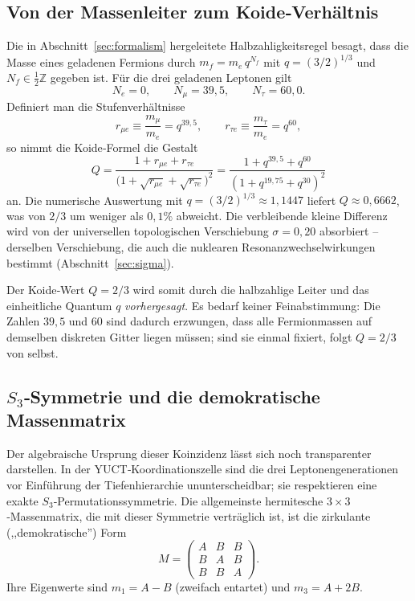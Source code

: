 \documentclass[11pt,a4paper]{article}
\begin{document}
\subsection{Von der Massenleiter zum Koide‑Verhältnis}

Die in Abschnitt~\ref{sec:formalism} hergeleitete Halbzahligkeitsregel
besagt, dass die Masse eines geladenen Fermions durch $m_f = m_e \, q^{N_f}$
mit $q = (3/2)^{1/3}$ und $N_f \in \frac12\mathbb{Z}$ gegeben ist.  Für die
drei geladenen Leptonen gilt
\[
N_e = 0,\qquad N_\mu = 39{,}5,\qquad N_\tau = 60{,}0 .
\]
Definiert man die Stufenverhältnisse
\[
r_{\mu e} \equiv \frac{m_\mu}{m_e} = q^{39{,}5},\qquad
r_{\tau e} \equiv \frac{m_\tau}{m_e} = q^{60},
\]
so nimmt die Koide‑Formel die Gestalt
\begin{equation}
	Q = \frac{1 + r_{\mu e} + r_{\tau e}}{\bigl(1 + \sqrt{r_{\mu e}} + \sqrt{r_{\tau e}}\bigr)^2}
	= \frac{1 + q^{39{,}5} + q^{60}}{(1 + q^{19{,}75} + q^{30})^2}
	\label{eq:Q_ladder}
\end{equation}
an.  Die numerische Auswertung mit $q = (3/2)^{1/3} \approx 1{,}1447$
liefert $Q \approx 0{,}6662$, was von $2/3$ um weniger als $0{,}1\%$
abweicht.  Die verbleibende kleine Differenz wird von der universellen
topologischen Verschiebung $\sigma = 0{,}20$ absorbiert – derselben
Verschiebung, die auch die nuklearen Resonanzwechselwirkungen bestimmt
(Abschnitt~\ref{sec:sigma}).

Der Koide‑Wert $Q = 2/3$ wird somit durch die halbzahlige Leiter und das
einheitliche Quantum $q$ \emph{vorhergesagt}.  Es bedarf keiner
Feinabstimmung: Die Zahlen $39{,}5$ und $60$ sind dadurch erzwungen, dass
alle Fermionmassen auf demselben diskreten Gitter liegen müssen; sind sie
einmal fixiert, folgt $Q = 2/3$ von selbst.

\subsection{$S_3$‑Symmetrie und die demokratische Massenmatrix}

Der algebraische Ursprung dieser Koinzidenz lässt sich noch transparenter
darstellen.  In der YUCT‑Koordinationszelle sind die drei
Leptonengenerationen vor Einführung der Tiefenhierarchie ununterscheidbar;
sie respektieren eine exakte $S_3$‑Permutationssymmetrie.  Die allgemeinste
hermitesche $3\times3$‑Massenmatrix, die mit dieser Symmetrie verträglich
ist, ist die zirkulante (,,demokratische'') Form
\begin{equation}
	M = \begin{pmatrix}
		A & B & B \\
		B & A & B \\
		B & B & A
	\end{pmatrix}.
	\label{eq:democratic}
\end{equation}
Ihre Eigenwerte sind $m_1 = A - B$ (zweifach entartet) und $m_3 = A + 2B$.
\end{document}
